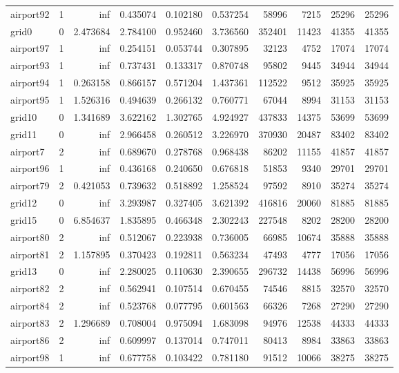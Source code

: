 \begin{longtable}{|l|r|r|r|r|r|r|r|r|r|}
airport92 & 1 & inf & 0.435074 & 0.102180 & 0.537254 & 58996 & 7215 & 25296 & 25296 \\
grid0 & 0 & 2.473684 & 2.784100 & 0.952460 & 3.736560 & 352401 & 11423 & 41355 & 41355 \\
airport97 & 1 & inf & 0.254151 & 0.053744 & 0.307895 & 32123 & 4752 & 17074 & 17074 \\
airport93 & 1 & inf & 0.737431 & 0.133317 & 0.870748 & 95802 & 9445 & 34944 & 34944 \\
airport94 & 1 & 0.263158 & 0.866157 & 0.571204 & 1.437361 & 112522 & 9512 & 35925 & 35925 \\
airport95 & 1 & 1.526316 & 0.494639 & 0.266132 & 0.760771 & 67044 & 8994 & 31153 & 31153 \\
grid10 & 0 & 1.341689 & 3.622162 & 1.302765 & 4.924927 & 437833 & 14375 & 53699 & 53699 \\
grid11 & 0 & inf & 2.966458 & 0.260512 & 3.226970 & 370930 & 20487 & 83402 & 83402 \\
airport7 & 2 & inf & 0.689670 & 0.278768 & 0.968438 & 86202 & 11155 & 41857 & 41857 \\
airport96 & 1 & inf & 0.436168 & 0.240650 & 0.676818 & 51853 & 9340 & 29701 & 29701 \\
airport79 & 2 & 0.421053 & 0.739632 & 0.518892 & 1.258524 & 97592 & 8910 & 35274 & 35274 \\
grid12 & 0 & inf & 3.293987 & 0.327405 & 3.621392 & 416816 & 20060 & 81885 & 81885 \\
grid15 & 0 & 6.854637 & 1.835895 & 0.466348 & 2.302243 & 227548 & 8202 & 28200 & 28200 \\
airport80 & 2 & inf & 0.512067 & 0.223938 & 0.736005 & 66985 & 10674 & 35888 & 35888 \\
airport81 & 2 & 1.157895 & 0.370423 & 0.192811 & 0.563234 & 47493 & 4777 & 17056 & 17056 \\
grid13 & 0 & inf & 2.280025 & 0.110630 & 2.390655 & 296732 & 14438 & 56996 & 56996 \\
airport82 & 2 & inf & 0.562941 & 0.107514 & 0.670455 & 74546 & 8815 & 32570 & 32570 \\
airport84 & 2 & inf & 0.523768 & 0.077795 & 0.601563 & 66326 & 7268 & 27290 & 27290 \\
airport83 & 2 & 1.296689 & 0.708004 & 0.975094 & 1.683098 & 94976 & 12538 & 44333 & 44333 \\
airport86 & 2 & inf & 0.609997 & 0.137014 & 0.747011 & 80413 & 8984 & 33863 & 33863 \\
airport98 & 1 & inf & 0.677758 & 0.103422 & 0.781180 & 91512 & 10066 & 38275 & 38275 \\

\end{longtable}
